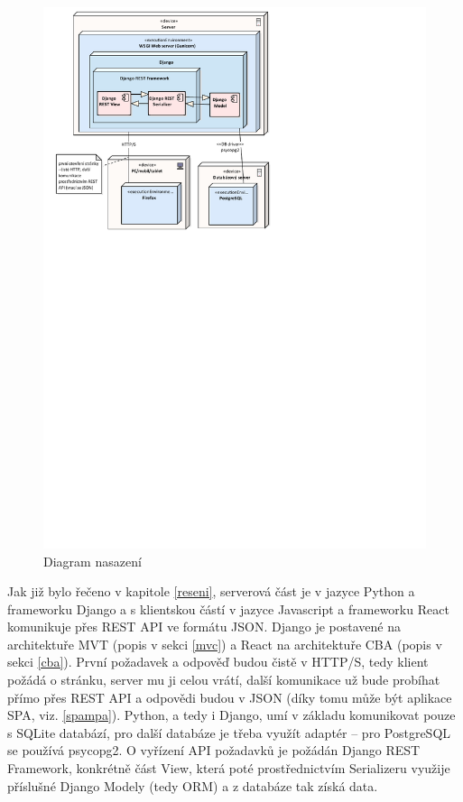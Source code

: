     \begin{figure}[ht]\centering
    	\includegraphics[width=1\textwidth]{img/deployment-diagram}
    	\caption[Diagram nasazení]{Diagram nasazení}\label{fig:deployment-diagram}
    \end{figure}
    
    Jak již bylo řečeno v kapitole \ref{reseni}, serverová část je v jazyce Python a frameworku Django a s klientskou částí v jazyce Javascript a frameworku React komunikuje přes REST API ve formátu JSON. Django je postavené na architektuře MVT (popis v sekci \ref{mvc}) a React na architektuře CBA (popis v sekci \ref{cba}). První požadavek a odpověď budou čistě v HTTP/S, tedy klient požádá o stránku, server mu ji celou vrátí, další komunikace už bude probíhat přímo přes REST API a odpovědi budou v JSON (díky tomu může být aplikace SPA, viz. \ref{spampa}). Python, a tedy i Django, umí v základu komunikovat pouze s SQLite databází, pro další databáze je třeba využít adaptér -- pro PostgreSQL se používá psycopg2. O vyřízení API požadavků je požádán Django REST Framework, konkrétně část View, která poté prostřednictvím Serializeru využije příslušné Django Modely (tedy ORM) a z databáze tak získá data.
    
